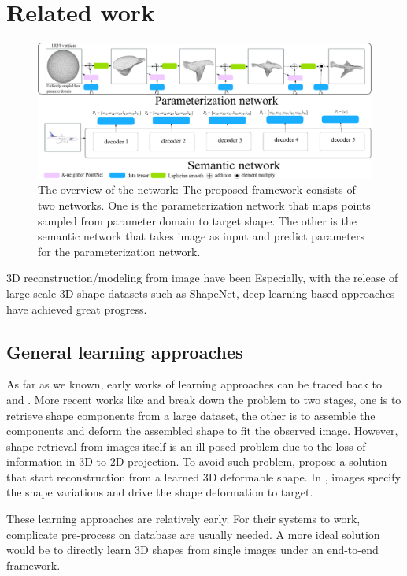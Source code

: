 \section{Related work}
\begin{figure}[htbp]
	\centering
	\includegraphics[width=\linewidth]{img/net/overview}
	\caption{The overview of the network: The proposed framework consists of two networks. One is the parameterization network that maps points sampled from parameter domain to target shape. The other is the semantic network that takes image as input and predict parameters for the parameterization network.}
	\label{fig:overview}
\end{figure}
3D reconstruction/modeling from image have been 
 Especially, with the release of large-scale 3D shape datasets such as ShapeNet\cite{shapenetdata}, deep learning based approaches have achieved great progress.
 
\subsection{General learning approaches}
As far as we known, early works of learning approaches can be traced back to \cite{Hoiem2007} and \cite{learn3D2007}. More recent works like \cite{Su:2014} and \cite{jointimgshape} break down the problem to two stages, one is to retrieve shape components from a large dataset, the other is to assemble the components and deform the assembled shape to fit the observed image. However, shape retrieval from images itself
is an ill-posed problem due to the loss of information in 3D-to-2D projection. To avoid such problem, \cite{imgrecon15} propose a solution that start reconstruction from a learned 3D deformable shape. 
In \cite{imgrecon15}, images specify the shape variations and drive the shape deformation to target.

These learning approaches are relatively early. For their systems to work, complicate pre-process on database are usually needed. A more ideal solution would be to directly learn 3D shapes
from single images under an end-to-end framework. 

